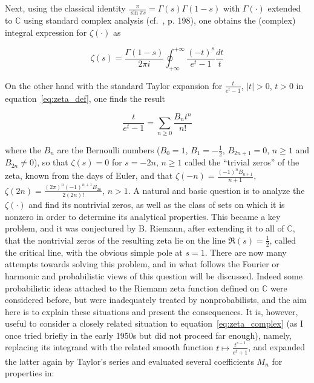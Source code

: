 \documentclass[11pt]{article}
\begin{document}
Next, using the classical identity $\frac{\pi}{\sin \pi s} = \Gamma(s)\Gamma(1-s)$ with $\Gamma(\cdot)$ extended to $\mathbb{C}$ using standard complex analysis (cf.~\cite{ahlfors}, p. 198), one obtains the (complex) integral expression for $\zeta(\cdot)$ as

\begin{equation}
\label{eq:zeta_complex}
\zeta(s) = \frac{\Gamma(1-s)}{2\pi i} \oint_{+\infty}^{+\infty} \frac{(-t)^s}{e^t - 1} \frac{dt}{t}
\end{equation}

On the other hand with the standard Taylor expansion for $\frac{t}{e^t-1}$, $|t| > 0$, $t > 0$ in equation~\eqref{eq:zeta_def}, one finds the result

\begin{equation}
\label{eq:taylor}
\frac{t}{e^t - 1} = \sum_{n \geq 0} \frac{B_n t^n}{n!}
\end{equation}

where the $B_n$ are the Bernoulli numbers ($B_0 = 1$, $B_1 = -\frac{1}{2}$, $B_{2n+1} = 0$, $n \geq 1$ and $B_{2n} \neq 0$), so that $\zeta(s) = 0$ for $s = -2n$, $n \geq 1$ called the ``trivial zeros'' of the zeta, known from the days of Euler, and that $\zeta(-n) = \frac{(-1)^n B_{n+1}}{n+1}$, $\zeta(2n) = \frac{(2\pi)^n (-1)^{n+1} B_{2n}}{2(2n)!}$, $n > 1$. A natural and basic question is to analyze the $\zeta(\cdot)$ and find its nontrivial zeros, as well as the class of sets on which it is nonzero in order to determine its analytical properties. This became a key problem, and it was conjectured by B. Riemann, after extending it to all of $\mathbb{C}$, that the nontrivial zeros of the resulting zeta lie on the line $\Re(s) = \frac{1}{2}$, called the critical line, with the obvious simple pole at $s = 1$. There are now many attempts towards solving this problem, and in what follows the Fourier or harmonic and probabilistic views of this question will be discussed. Indeed some probabilistic ideas attached to the Riemann zeta function defined on $\mathbb{C}$ were considered before, but were inadequately treated by nonprobabilists, and the aim here is to explain these situations and present the consequences. It is, however, useful to consider a closely related situation to equation~\eqref{eq:zeta_complex} (as I once tried briefly in the early 1950s but did not proceed far enough), namely, replacing its integrand with the related smooth function $t \mapsto \frac{t^{s-1}}{e^t+1}$, and expanded the latter again by Taylor's series and evaluated several coefficients $M_n$ for properties in:
\end{document}
